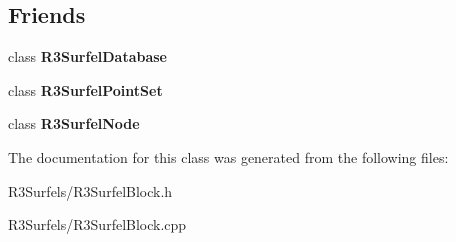 \subsection*{Friends}
\begin{DoxyCompactItemize}
\item 
class {\bfseries R3\+Surfel\+Database}\hypertarget{class_r3_surfel_block_add57db51766e3254511cc25e8bc076fe}{}\label{class_r3_surfel_block_add57db51766e3254511cc25e8bc076fe}

\item 
class {\bfseries R3\+Surfel\+Point\+Set}\hypertarget{class_r3_surfel_block_a0a1a5667fbb83b10655b17ca961c0a94}{}\label{class_r3_surfel_block_a0a1a5667fbb83b10655b17ca961c0a94}

\item 
class {\bfseries R3\+Surfel\+Node}\hypertarget{class_r3_surfel_block_ad9dff58c5073daa8391435943516b352}{}\label{class_r3_surfel_block_ad9dff58c5073daa8391435943516b352}

\end{DoxyCompactItemize}


The documentation for this class was generated from the following files\+:\begin{DoxyCompactItemize}
\item 
R3\+Surfels/R3\+Surfel\+Block.\+h\item 
R3\+Surfels/R3\+Surfel\+Block.\+cpp\end{DoxyCompactItemize}
